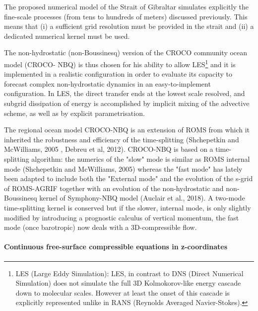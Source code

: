 The proposed numerical model of the Strait of Gibraltar simulates explicitly the fine-scale processes (from tens to hundreds of meters) discussed previously. This means that (i) a sufficient grid resolution must be provided in the strait and (ii) a dedicated numerical kernel must be used.

The non-hydrostatic (non-Boussinesq) version of the CROCO community ocean model (CROCO- NBQ) is thus chosen for his ability to allow LES\footnote{LES (Large Eddy Simulation): LES, in contrast to DNS (Direct Numerical Simulation) does not simulate the full 3D Kolmokorov-like energy cascade down to molecular scales. However at least the onset of this cascade is explicitly represented unlike in RANS (Reynolds Averaged Navier-Stokes).} and it is implemented in a realistic configuration in order to evaluate its capacity to forecast complex non-hydrostatic dynamics in an easy-to-implement configuration. In LES, the direct transfer ends at the lowest scale resolved, and subgrid dissipation of energy is accomplished by implicit mixing of the advective scheme, as well as by explicit parametrisation.

The regional ocean model CROCO-NBQ is an extension of ROMS from which it inherited the robustness and efficiency of the time-splitting (Shchepetkin and McWilliams, 2005 , Debreu et al, 2012). CROCO-NBQ is based on a time-splitting algorithm: the numerics of the "slow" mode is similar as ROMS internal mode (Shchepetkin and McWilliams, 2005) whereas the "fast mode" has lately been adapted to include both the "External mode" and the evolution of the s-grid of ROMS-AGRIF together with an evolution of the non-hydrostatic and non-Boussinesq kernel of Symphony-NBQ model (Auclair et al., 2018). A two-mode time-splitting kernel is conserved but if the slower, internal mode, is only slightly modified by introducing a prognostic calculus of vertical momentum, the fast mode (once barotropic) now deals with a 3D-compressible flow. \\

 \paragraph{Continuous free-surface compressible equations in z-coordinates}
 \label{NavierStokes}
 

